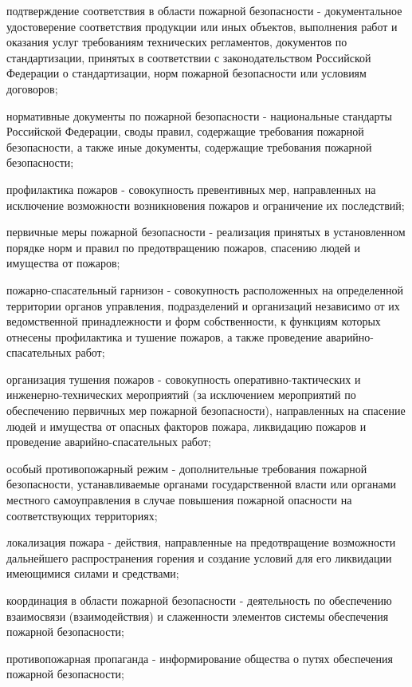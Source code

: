 \documentclass[a4paper, 12pt]{article}
\theoremstyle{definition}
\begin{document}
        подтверждение соответствия в области пожарной безопасности - документальное удостоверение соответствия продукции или иных объектов, выполнения работ и оказания услуг требованиям технических регламентов, документов по стандартизации, принятых в соответствии с законодательством Российской Федерации о стандартизации, норм пожарной безопасности или условиям договоров;


        нормативные документы по пожарной безопасности - национальные стандарты Российской Федерации, своды правил, содержащие требования пожарной безопасности, а также иные документы, содержащие требования пожарной безопасности;


        профилактика пожаров - совокупность превентивных мер, направленных на исключение возможности возникновения пожаров и ограничение их последствий;


        первичные меры пожарной безопасности - реализация принятых в установленном порядке норм и правил по предотвращению пожаров, спасению людей и имущества от пожаров;

        пожарно-спасательный гарнизон - совокупность расположенных на определенной территории органов управления, подразделений и организаций независимо от их ведомственной принадлежности и форм собственности, к функциям которых отнесены профилактика и тушение пожаров, а также проведение аварийно-спасательных работ;

        организация тушения пожаров - совокупность оперативно-тактических и\\ инженерно-технических мероприятий (за исключением мероприятий по обеспечению первичных мер пожарной безопасности), направленных на спасение людей и имущества от опасных факторов пожара, ликвидацию пожаров и проведение аварийно-спасательных работ;

        особый противопожарный режим - дополнительные требования пожарной безопасности, устанавливаемые органами государственной власти или органами местного самоуправления в случае повышения пожарной опасности на соответствующих территориях;

        локализация пожара - действия, направленные на предотвращение возможности дальнейшего распространения горения и создание условий для его ликвидации имеющимися силами и средствами;

        координация в области пожарной безопасности - деятельность по обеспечению взаимосвязи (взаимодействия) и слаженности элементов системы обеспечения пожарной безопасности;

        противопожарная пропаганда - информирование общества о путях обеспечения пожарной безопасности;
\end{document}
